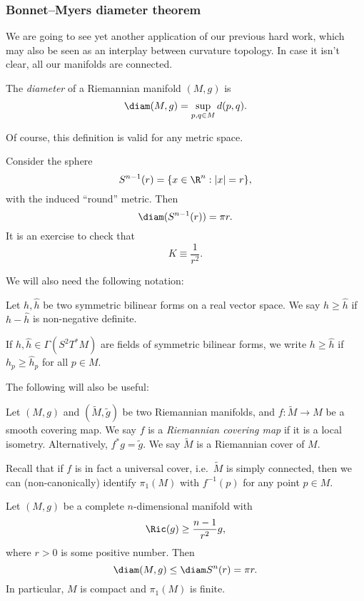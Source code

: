 \documentclass[a4paper]{article}
\begin{document}
\subsubsection*{Bonnet--Myers diameter theorem}
We are going to see yet another application of our previous hard work, which may also be seen as an interplay between curvature topology. In case it isn't clear, all our manifolds are connected.

\begin{defi}[Diameter]
  The \emph{diameter} of a Riemannian manifold $(M, g)$ is
  \[
    \diam(M, g) = \sup_{p, q \in M} d(p, q).
  \]
\end{defi}
Of course, this definition is valid for any metric space.
\begin{eg}
  Consider the sphere
  \[
    S^{n - 1}(r) = \{x \in \R^n: |x| = r\},
  \]
  with the induced ``round'' metric. Then
  \[
    \diam (S^{n - 1} (r)) = \pi r.
  \]
  It is an exercise to check that
  \[
    K \equiv \frac{1}{r^2}.
  \]
\end{eg}

We will also need the following notation:
\begin{notation}
  Let $h, \hat{h}$ be two symmetric bilinear forms on a real vector space. We say $h \geq \hat{h}$ if $h - \hat{h}$ is non-negative definite.

  If $h, \hat{h} \in \Gamma(S^2 T^* M)$ are fields of symmetric bilinear forms, we write $h \geq \hat{h}$ if $h_p \geq \hat{h}_p$ for all $p \in M$.
\end{notation}

The following will also be useful:
\begin{defi}
  Let $(M, g)$ and $(\tilde{M}, \tilde{g})$ be two Riemannian manifolds, and $f: \tilde{M} \to M$ be a smooth covering map. We say $f$ is a \emph{Riemannian covering map} if it is a local isometry. Alternatively, $f^* g = \tilde{g}$. We say $\tilde{M}$ is a Riemannian cover of $M$.
\end{defi}

Recall that if $f$ is in fact a universal cover, i.e.\ $\tilde{M}$ is simply connected, then we can (non-canonically) identify $\pi_1(M)$ with $f^{-1}(p)$ for any point $p \in M$.

\begin{defi}
  Let $(M, g)$ be a complete $n$-dimensional manifold with
  \[
    \Ric(g) \geq \frac{n - 1}{r^2} g,
  \]
  where $r > 0$ is some positive number. Then
  \[
    \diam(M, g) \leq \diam S^n(r) = \pi r.
  \]
  In particular, $M$ is compact and $\pi_1(M)$ is finite.
\end{defi}
\end{document}
